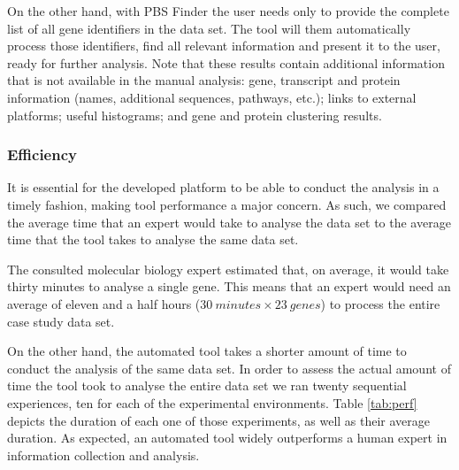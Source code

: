 On the other hand, with PBS Finder the user needs only to provide the complete
list of all gene identifiers in the data set. The tool will them automatically
process those identifiers, find all relevant information and present it to the
user, ready for further analysis. Note that these results contain additional
information that is not available in the manual analysis: gene, transcript and
protein information (names, additional sequences, pathways, etc.); links to
external platforms; useful histograms; and gene and protein clustering results.

\subsubsection*{Efficiency}

It is essential for the developed platform to be able to conduct the analysis in
a timely fashion, making tool performance a major concern. As such, we compared
the average time that an expert would take to analyse the data set to the
average time that the tool takes to analyse the same data set.

The consulted molecular biology expert estimated that, on average, it would take
thirty minutes to analyse a single gene. This means that an expert would need an
average of eleven and a half hours ($30\ minutes \times 23\ genes$) to process the
entire case study data set.

On the other hand, the automated tool takes a shorter amount of time to conduct
the analysis of the same data set. In order to assess the actual amount of time
the tool took to analyse the entire data set we ran twenty sequential
experiences, ten for each of the experimental environments. Table \ref{tab:perf}
depicts the duration of each one of those experiments, as well as their average
duration. As expected, an automated tool widely outperforms a human expert in
information collection and analysis.

